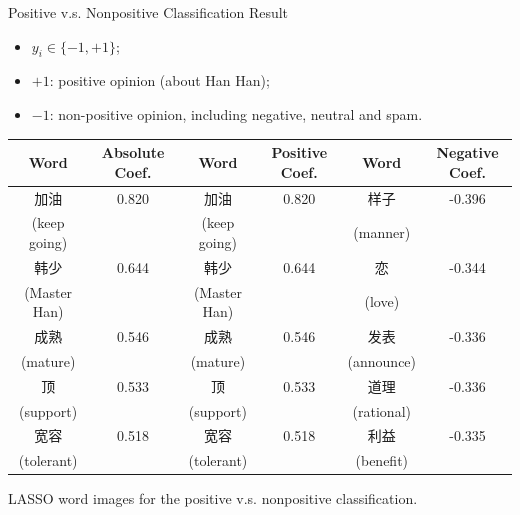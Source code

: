 \documentclass[12pt]{beamer}
\newcommand{\1}[1]{{\mathbf 1}\left\{#1\right\}}        %
\begin{document}
\begin{frame}{Positive v.s. Nonpositive Classification Result}

\begin{itemize}[<+->]
\item $y_i\in\{-1,+1\}$;
\item $+1$: positive opinion (about Han Han);
\item $-1$: non-positive opinion, including negative, neutral and spam.
\end{itemize}

\tiny
\begin{center}
\begin{tabular}{|c|c||c|c||c|c|}
\hline
Word & Absolute Coef. & Word & Positive Coef. & Word & Negative Coef.\\ \hline \hline
加油 & 0.820 & 加油 & 0.820 & 样子 & -0.396\\
(keep going) & & (keep going) & & (manner) & \\\hline
韩少 & 0.644 & 韩少 & 0.644 & 恋 & -0.344\\
(Master Han) & & (Master Han) & & (love) & \\\hline
成熟 & 0.546 & 成熟 & 0.546 & 发表 & -0.336\\
(mature) & & (mature) & & (announce) & \\\hline
顶 & 0.533 & 顶 & 0.533 & 道理 & -0.336\\
(support) & & (support) & & (rational) & \\\hline
宽容 & 0.518 & 宽容 & 0.518 & 利益 & -0.335\\
(tolerant) & & (tolerant) & & (benefit) & \\\hline
\end{tabular}
LASSO word images for the positive v.s. nonpositive classification.
\end{center}


\end{frame}
\end{document}
